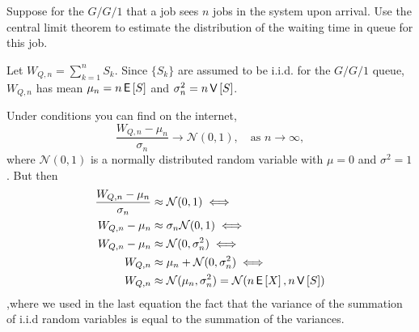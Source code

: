 \begin{exercise}
 Suppose for the $G/G/1$ that a job sees $n$ jobs in the system upon arrival.
 Use the central limit theorem to estimate the distribution of the waiting time in queue for this job.
\begin{hint}
 Let $W_{Q,n} = \sum_{k=1}^n S_k$.
 Since $\{S_k\}$ are assumed to be i.i.d.
 for the $G/G/1$ queue, $W_{Q,n}$ has mean $\mu_n = n \,\mathsf{E}\left[S\right]$ and $\sigma_n^2 = n\,\mathsf{V}\left[S\right]$.
\end{hint}
\begin{solution} Under conditions you can find on the internet,
 \begin{equation*}
 \frac{W_{Q,n} - \mu_n}{\sigma_n} \to \mathcal{N}(0,1), \quad\text{as } n\to \infty,
 \end{equation*}
 where $\mathcal{N}(0,1)$ is a normally distributed random variable
 with $\mu=0$ and $\sigma^2=1$. But then 
 \begin{align*}
 \frac{W_{Q,n} - \mu_n}{\sigma_n} &\approx \mathcal{N}(0,1) \iff\\
 W_{Q,n} - \mu_n &\approx \sigma_n \mathcal{N}(0,1) \iff\\
 W_{Q,n} - \mu_n &\approx \mathcal{N}(0,\sigma_n^2) \iff\\
 W_{Q,n} &\approx \mu_n + \mathcal{N}(0,\sigma_n^2) \iff\\
 W_{Q,n} &\approx \mathcal{N}(\mu_n,\sigma_n^2) = \mathcal{N}(n\,\mathsf{E}\left[X\right], n \,\mathsf{V}\left[S\right])
 \end{align*}
,where we used in the last equation the fact that the variance of the summation of i.i.d random variables is equal to the summation of the variances.
\end{solution}
\end{exercise}




